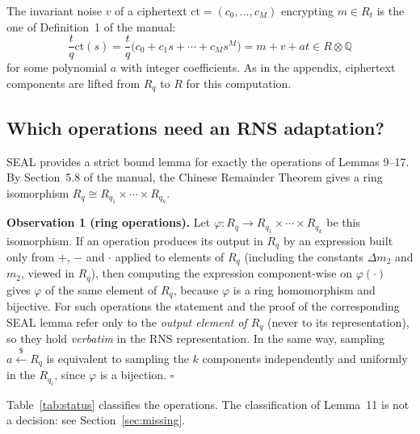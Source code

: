 \documentclass[11pt]{article}
\newcommand{\ct}{\mathrm{ct}}
\theoremstyle{plain}
\theoremstyle{definition}
\theoremstyle{remark}
\begin{document}
The invariant noise $v$ of a ciphertext $\ct=(c_0,\dots,c_M)$ encrypting $m\in R_t$
is the one of Definition~1 of the manual:
\[
  \frac{t}{q}\ct(s)=\frac{t}{q}\bigl(c_0+c_1s+\cdots+c_Ms^M\bigr)=m+v+at\in R\otimes\mathbb{Q}
\]
for some polynomial $a$ with integer coefficients. As in the appendix, ciphertext
components are lifted from $R_q$ to $R$ for this computation.

\subsection{Which operations need an RNS adaptation?}

SEAL provides a strict bound lemma for exactly the operations of Lemmas 9--17.
By Section~5.8 of the manual, the Chinese Remainder Theorem gives a ring
isomorphism $R_q\cong R_{q_1}\times\cdots\times R_{q_k}$.

\textbf{Observation 1 (ring operations).}
Let $\varphi\colon R_q\to R_{q_1}\times\cdots\times R_{q_k}$ be this isomorphism.
If an operation produces its output in $R_q$ by an expression built only from
$+$, $-$ and $\cdot$ applied to elements of $R_q$ (including the constants
$\Delta m_2$ and $m_2$, viewed in $R_q$), then computing the expression
component-wise on $\varphi(\cdot)$ gives $\varphi$ of the same element of $R_q$,
because $\varphi$ is a ring homomorphism and bijective. For such operations the
statement and the proof of the corresponding SEAL lemma refer only to the
\emph{output element of $R_q$} (never to its representation), so they hold
\emph{verbatim} in the RNS representation. In the same way, sampling
$a\xleftarrow{\$}R_q$ is equivalent to sampling the $k$ components
independently and uniformly in the $R_{q_i}$, since $\varphi$ is a bijection.
\hfill$\square$

Table~\ref{tab:status} classifies the operations. The classification of
Lemma~11 is not a decision: see Section~\ref{sec:missing}.
\end{document}
